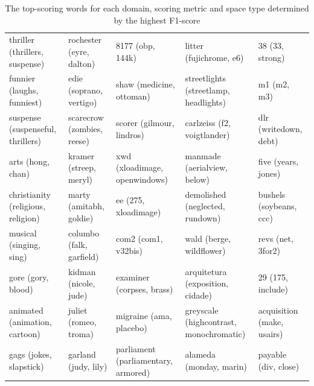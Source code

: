\begin{landscape}
\begin{table}[]
\begin{tabular}{lllll}
			thriller (thrillers, suspense)       & rochester (eyre, dalton)       & 8177 (obp, 144k)                           & litter (fujichrome, e6)                 & 38 (33, strong)                   \\
			funnier (laughs, funniest)           & edie (soprano, vertigo)        & shaw (medicine, ottoman)                   & streetlights (streetlamp, headlights)   & m1 (m2, m3)                       \\
			suspense (suspenseful, thrillers)    & scarecrow (zombies, reese)     & scorer (gilmour, lindros)                  & carlzeiss (f2, voigtlander)             & dlr (writedown, debt)             \\
			arts (hong, chan)                    & kramer (streep, meryl)         & xwd (xloadimage, openwindows)              & manmade (aerialview, below)             & five (years, jones)               \\
			christianity (religious, religion)   & marty (amitabh, goldie)        & ee (275, xloadimage)                       & demolished (neglected, rundown)         & bushels (soybeans, ccc)           \\
			musical (singing, sing)              & columbo (falk, garfield)       & com2 (com1, v32bis)                        & wald (berge, wildflower)                & revs (net, 3for2)                 \\
			gore (gory, blood)                   & kidman (nicole, jude)          & examiner (corpses, brass)                  & arquitetura (exposition, cidade)        & 29 (175, include)                 \\
			animated (animation, cartoon)        & juliet (romeo, troma)          & migraine (ama, placebo)                    & greyscale (highcontrast, monochromatic) & acquisition (make, usairs)        \\
			gags (jokes, slapstick)              & garland (judy, lily)           & parliament (parliamentary, armored)        & alameda (monday, marin)                 & payable (div, close)              \\          
			
		\end{tabular}
		\caption{The top-scoring words for each domain, scoring metric and space type determined by the highest F1-score}\label{ch3:TopScoringQua}
	\end{table}
\end{landscape}





